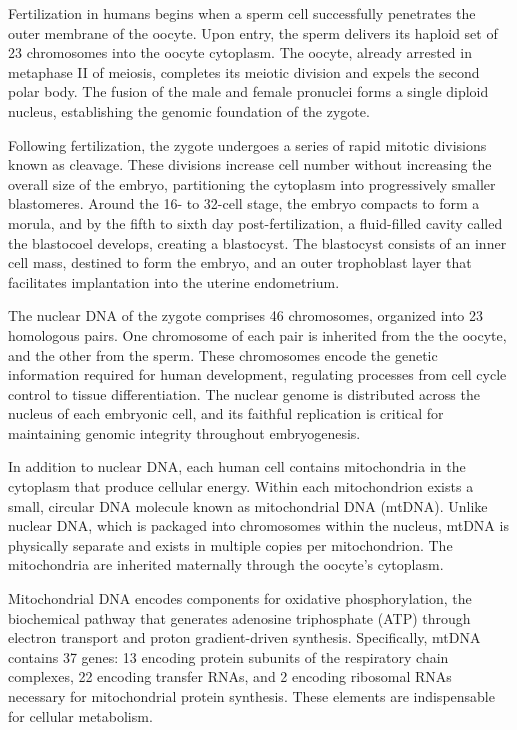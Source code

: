 Fertilization in humans begins when a sperm cell successfully penetrates the outer membrane of the oocyte. Upon entry, the sperm delivers its haploid set of 23 chromosomes into the oocyte cytoplasm. The oocyte, already arrested in metaphase II of meiosis, completes its meiotic division and expels the second polar body. The fusion of the male and female pronuclei forms a single diploid nucleus, establishing the genomic foundation of the zygote.

Following fertilization, the zygote undergoes a series of rapid mitotic divisions known as cleavage. These divisions increase cell number without increasing the overall size of the embryo, partitioning the cytoplasm into progressively smaller blastomeres. Around the 16- to 32-cell stage, the embryo compacts to form a morula, and by the fifth to sixth day post-fertilization, a fluid-filled cavity called the blastocoel develops, creating a blastocyst. The blastocyst consists of an inner cell mass, destined to form the embryo, and an outer trophoblast layer that facilitates implantation into the uterine endometrium.

The nuclear DNA of the zygote comprises 46 chromosomes, organized into 23 homologous pairs. One chromosome of each pair is inherited from the the oocyte, and the other from the sperm. These chromosomes encode the genetic information required for human development, regulating processes from cell cycle control to tissue differentiation. The nuclear genome is distributed across the nucleus of each embryonic cell, and its faithful replication is critical for maintaining genomic integrity throughout embryogenesis.

In addition to nuclear DNA, each human cell contains mitochondria in the cytoplasm that produce cellular energy. Within each mitochondrion exists a small, circular DNA molecule known as mitochondrial DNA (mtDNA). Unlike nuclear DNA, which is packaged into chromosomes within the nucleus, mtDNA is physically separate and exists in multiple copies per mitochondrion. The mitochondria are inherited maternally through the oocyte's cytoplasm.

Mitochondrial DNA encodes components for oxidative phosphorylation, the biochemical pathway that generates adenosine triphosphate (ATP) through electron transport and proton gradient-driven synthesis. Specifically, mtDNA contains 37 genes: 13 encoding protein subunits of the respiratory chain complexes, 22 encoding transfer RNAs, and 2 encoding ribosomal RNAs necessary for mitochondrial protein synthesis. These elements are indispensable for cellular metabolism.


